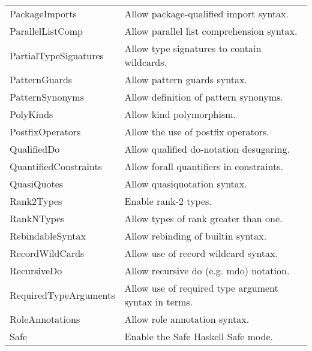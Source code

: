 \documentclass[openany, 12pt]{book}
\begin{document}
\begin{center}
\begin{supertabular}{ll}
		PackageImports             & Allow package-qualified import syntax.                                     \\
		ParallelListComp           & Allow parallel list comprehension syntax.                                  \\
		PartialTypeSignatures      & Allow type signatures to contain wildcards.                                \\
		PatternGuards              & Allow pattern guards syntax.                                               \\
		PatternSynonyms            & Allow definition of pattern synonyms.                                      \\
		PolyKinds                  & Allow kind polymorphism.                                                   \\
		PostfixOperators           & Allow the use of postfix operators.                                        \\
		QualifiedDo                & Allow qualified do-notation desugaring.                                    \\
		QuantifiedConstraints      & Allow forall quantifiers in constraints.                                   \\
		QuasiQuotes                & Allow quasiquotation syntax.                                               \\
		Rank2Types                 & Enable rank-2 types.                                                       \\
		RankNTypes                 & Allow types of rank greater than one.                                      \\
		RebindableSyntax           & Allow rebinding of builtin syntax.                                         \\
		RecordWildCards            & Allow use of record wildcard syntax.                                       \\
		RecursiveDo                & Allow recursive do (e.g. mdo) notation.                                    \\
		RequiredTypeArguments      & Allow use of required type argument syntax in terms.                       \\
		RoleAnnotations            & Allow role annotation syntax.                                              \\
		Safe                       & Enable the Safe Haskell Safe mode.                                         \\

\end{supertabular}
\end{center}
\end{document}
